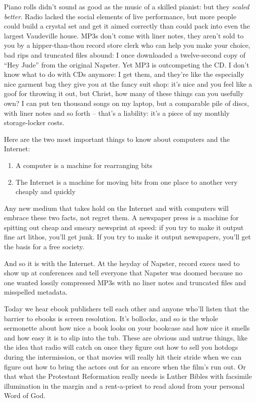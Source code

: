 Piano rolls didn't sound as good as the music of a skilled pianist:
but they \emph{scaled better}. Radio lacked the social elements
of live performance, but more people could build a crystal set and
get it aimed correctly than could pack into even the largest
Vaudeville house. MP3s don't come with liner notes, they aren't
sold to you by a hipper-than-thou record store clerk who can help
you make your choice, bad rips and truncated files abound: I once
downloaded a twelve-second copy of ``Hey Jude'' from the original
Napster. Yet MP3 is outcompeting the CD. I don't know what to do
with CDs anymore: I get them, and they're like the especially nice
garment bag they give you at the fancy suit shop: it's nice and you
feel like a goof for throwing it out, but Christ, how many of these
things can you usefully own? I can put ten thousand songs on my
laptop, but a comparable pile of discs, with liner notes and so
forth -- that's a liability: it's a piece of my monthly
storage-locker costs.

Here are the two most important things to know about computers and
the Internet:

\begin{enumerate}
\item
  A computer is a machine for rearranging bits
\item
  The Internet is a machine for moving bits from one place to another
  very cheaply and quickly
\end{enumerate}
Any new medium that takes hold on the Internet and with computers
will embrace these two facts, not regret them. A newspaper press is
a machine for spitting out cheap and smeary newsprint at speed: if
you try to make it output fine art lithos, you'll get junk. If you
try to make it output newspapers, you'll get the basis for a free
society.

And so it is with the Internet. At the heyday of Napster, record
execs used to show up at conferences and tell everyone that Napster
was doomed because no one wanted lossily compressed MP3s with no
liner notes and truncated files and misspelled metadata.

Today we hear ebook publishers tell each other and anyone who'll
listen that the barrier to ebooks is screen resolution. It's
bollocks, and so is the whole sermonette about how nice a book
looks on your bookcase and how nice it smells and how easy it is to
slip into the tub. These are obvious and untrue things, like the
idea that radio will catch on once they figure out how to sell you
hotdogs during the intermission, or that movies will really hit
their stride when we can figure out how to bring the actors out for
an encore when the film's run out. Or that what the Protestant
Reformation really needs is Luther Bibles with facsimile
illumination in the margin and a rent-a-priest to read aloud from
your personal Word of God.


